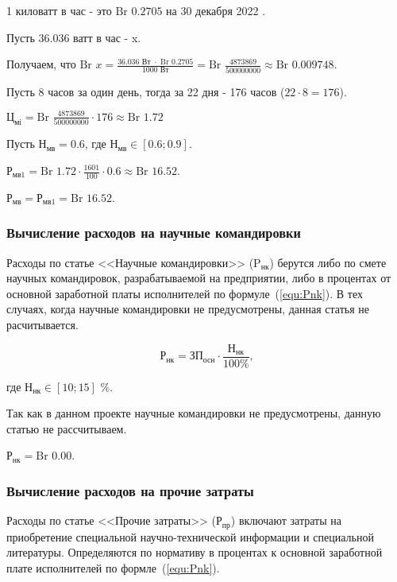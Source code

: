 1 киловатт в час - это $\text{Br } 0.2705$ на 30 декабря 2022 \cite{economicKilovatVCasPravoBy}.

Пусть $36.036 \text{ ватт в час}$ - x.

Получаем, что $\text{Br } x = \frac{36.036 \text{ Вт } \cdot \text{ Br } 0.2705}{1000 \text{ Вт} } = \text{Br } \frac{4873869}{500000000} \approx \text{Br } 0.009748$.

Пусть 8 часов за один день, тогда за 22 дня - 176 часов ($22 \cdot 8 = 176$).

$\text{Ц}_\text{мi} = \text{Br } \frac{4873869}{500000000} \cdot 176 \approx \text{Br } 1.72$

Пусть $\text{Н}_\text{мв} = 0.6$, где $\text{Н}_\text{мв} \in [0.6; 0.9]$.

$\text{Р}_\text{мв1} = \text{Br } 1.72 \cdot \frac{ 1601 }{ 100 } \cdot 0.6 \approx \text{Br } 16.52$.

$\text{Р}_\text{мв} = \text{Р}_\text{мв1} = \text{Br } 16.52$.

\subsubsection*{Вычисление расходов на научные командировки}

Расходы по статье <<Научные командировки>> ($\text{P}_\text{нк}$)
берутся либо по смете научных командировок, разрабатываемой на предприятии,
либо в процентах от основной заработной платы исполнителей по формуле~(\ref{equ:Pnk}).
В тех случаях, когда научные командировки не предусмотрены, данная статья не расчитывается.

\begin{equation}
    \label{equ:Pnk}
    \text{Р}_\text{нк} = \text{ЗП}_\text{осн} \cdot \frac{ \text{Н}_\text{нк} }{ 100\% } \text{,}
\end{equation}

где $\text{Н}_\text{нк} \in [10; 15]$ \%.

Так как в данном проекте научные командировки не предусмотрены, данную статью не рассчитываем. 

$\text{Р}_\text{нк} = \text{Br } 0.00$.

\subsubsection*{Вычисление расходов на прочие затраты}

Расходы по статье <<Прочие затраты>> ($\text{Р}_\text{пр}$)
включают затраты на приобретение специальной научно-технической информации и специальной литературы.
Определяются по нормативу в процентах к основной заработной плате исполнителей по формле~(\ref{equ:Pnk}).

